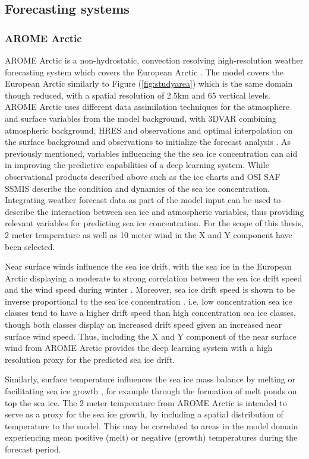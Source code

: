 \documentclass[../main/thesis.tex]{subfiles}
\begin{document}
\subsection{Forecasting systems} 
\subsubsection{AROME Arctic}
AROME Arctic is a non-hydrostatic, convection resolving high-resolution weather forecasting system which covers the European Arctic \citep{Mueller2017}. The model covers the European Arctic similarly to Figure (\ref{fig:studyarea}) which is the same domain though reduced, with a spatial resolution of 2.5km and 65 vertical levels. AROME Arctic uses different data assimilation techniques for the atmosphere and surface variables from the model background, with 3DVAR combining atmospheric background, HRES and observations and optimal interpolation on the surface background and observations to initialize the forecast analysis \cite{Mueller2017}. As previously mentioned, variables influencing the the sea ice concentration can aid in improving the predictive capabilities of a deep learning system. While observational products described above such as the ice charts \citep{Dinessen2020} and OSI SAF SSMIS \citep{Tonboe2017} describe the condition and dynamics of the sea ice concentration. Integrating weather forecast data as part of the model input can be used to describe the interaction between sea ice and atmospheric variables, thus providing relevant variables for predicting sea ice concentration. For the scope of this thesis, 2 meter temperature as well as 10 meter wind in the X and Y component have been selected.

Near surface winds influence the sea ice drift, with the sea ice in the European Arctic displaying a moderate to strong correlation between the sea ice drift speed and the wind speed during winter \citep{Spreen2011}. Moreover, sea ice drift speed is shown to be inverse proportional to the sea ice concentration \citep{Yu2020}. i.e. low concentration sea ice classes tend to have a higher drift speed than high concentration sea ice classes, though both classes display an increased drift speed given an increased near surface wind speed. Thus, including the X and Y component of the near surface wind from AROME Arctic provides the deep learning system with a high resolution proxy for the predicted sea ice drift. 

Similarly, surface temperature influences the sea ice mass balance by melting or facilitating sea ice growth \citep{Hibler1979}, for example through the formation of melt ponds on top the sea ice. The 2 meter temperature from AROME Arctic is intended to serve as a proxy for the sea ice growth, by including a spatial distribution of temperature to the model. This may be correlated to areas in the model domain experiencing mean positive (melt) or negative (growth) temperatures during the forecast period.
\end{document}
